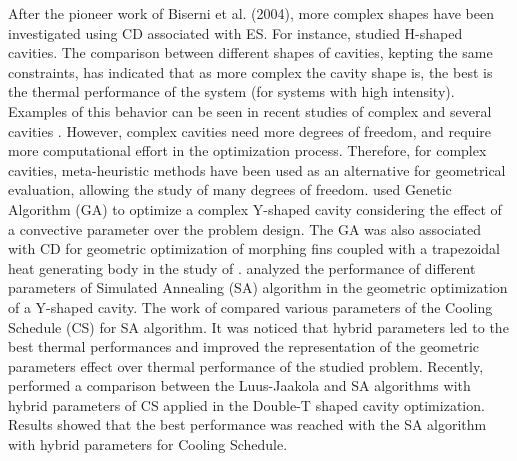 \documentclass[12pt,fleqn]{article}
\begin{document}
After the pioneer work of Biserni et al. (2004), more complex shapes have been investigated using CD associated with ES. For instance, \cite{Biserni2007} studied H-shaped cavities. The comparison between different shapes of cavities, kepting the same constraints, has indicated that as more complex the cavity shape is, the best is the thermal performance of the system (for systems with high intensity). Examples of this behavior can be seen in recent studies of complex and several cavities \citep{Xie2010,Lorenzini2012,Lorenzini2014}. However, complex cavities need more degrees of freedom, and require more computational effort in the optimization process. Therefore, for complex cavities, meta-heuristic methods have been used as an alternative for geometrical evaluation, allowing the study of many degrees of freedom. \cite{Lorenzini2014} used Genetic Algorithm (GA) to optimize a complex Y-shaped cavity considering the effect of a convective parameter over the problem design. The GA was also associated with CD for geometric optimization of morphing fins coupled with a trapezoidal heat generating body in the study of \cite{Biserni2017}. \cite{Gonzales2015a} analyzed the performance of different parameters of Simulated Annealing (SA) algorithm in the geometric optimization of a Y-shaped cavity. The work of \cite{Gonzales2015a} compared various parameters of the Cooling Schedule (CS) for SA algorithm. It was noticed that hybrid parameters led to the best thermal performances and improved the representation of the geometric parameters effect over thermal performance of the studied problem. Recently, \cite{Gonzales2017} performed a comparison between the Luus-Jaakola and SA algorithms with hybrid parameters of CS applied in the Double-T shaped cavity optimization. Results showed that the best performance was reached with the SA algorithm with hybrid parameters for Cooling Schedule.
\end{document}
